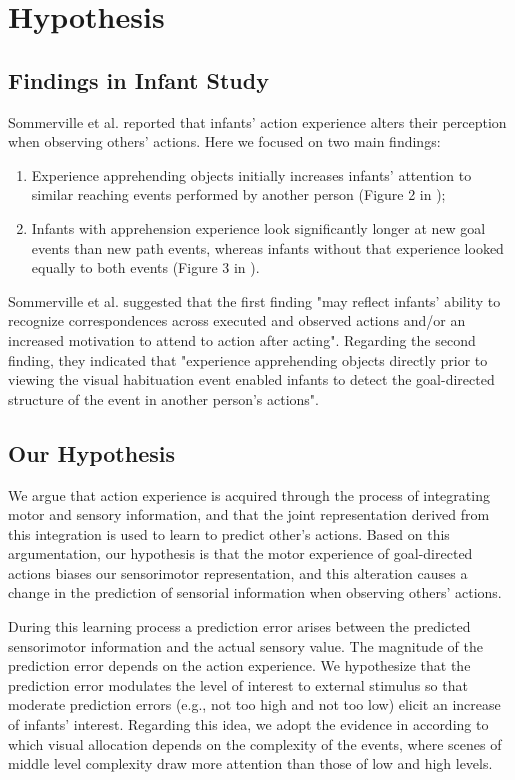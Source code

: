 \documentclass[conference]{IEEEtran}
\begin{document}
\section{Hypothesis}
 
\subsection{Findings in Infant Study}
Sommerville et al. \cite{sommerville2005action} reported that infants' action experience alters their perception when observing others' actions. Here we focused on two main findings:
 
\begin{enumerate}
\item Experience apprehending objects initially increases infants’ attention to similar reaching events performed by another person (Figure 2 in \cite{sommerville2005action});
\item Infants with apprehension experience look significantly longer at new goal events than new path events, whereas infants without that experience looked equally to both events (Figure 3 in \cite{sommerville2005action}).
\end{enumerate}
 
Sommerville et al. \cite{sommerville2005action} suggested that the first finding "may reflect infants’ ability to recognize correspondences across executed and observed actions and/or an increased motivation to attend to action after acting". Regarding the second finding, they indicated that "experience apprehending objects directly prior to viewing the visual habituation event enabled infants to detect the goal-directed structure of the event in another person's actions".

\subsection{Our Hypothesis}
We argue that action experience is acquired through the process of integrating motor and sensory information, and that the joint representation derived from this integration is used to learn to predict other's actions. Based on this argumentation, our hypothesis is that the motor experience of goal-directed actions biases our sensorimotor representation, and this alteration causes a change in the prediction of sensorial information when observing others' actions.

During this learning process a prediction error arises between the predicted sensorimotor information and the actual sensory value. The magnitude of the prediction error depends on the action experience. We hypothesize that the prediction error modulates the level of interest to external stimulus so that moderate prediction errors (e.g., not too high and not too low) elicit an increase of infants’ interest. Regarding this idea, we adopt the evidence in \cite{kidd2012goldilocks} according to which visual allocation depends on the complexity of the events, where scenes of middle level complexity draw more attention than those of low and high levels.
\end{document}
